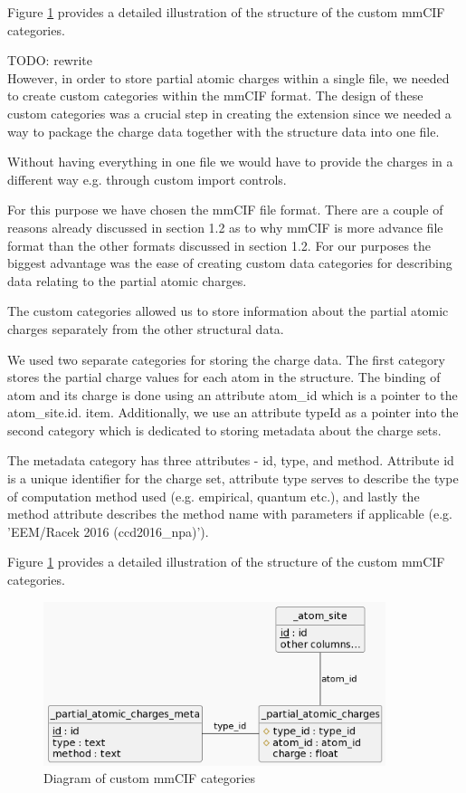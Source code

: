 \documentclass[
  digital,     %
  oneside,     %
  nosansbold,  %
  nocolorbold, %
  lof,         %
  lot,         %
]{fithesis4}
\begin{document}
Figure \ref{fig:mmcif_erd} provides a detailed illustration of the structure of the custom mmCIF categories.

TODO: rewrite \\

However, in order to store partial atomic charges within a single file, we needed to create custom categories within the mmCIF format.
The design of these custom categories was a crucial step in creating the extension since we needed a way to package the charge data together with the structure data into one file.

Without having everything in one file we would have to provide the charges in a different way e.g. through custom import controls.

For this purpose we have chosen the mmCIF file format. There are a couple of reasons already discussed in section 1.2 as to why mmCIF is more advance file format than the other formats discussed in section 1.2. For our purposes the biggest advantage was the ease of creating custom data categories for describing data relating to the partial atomic charges.

The custom categories allowed us to store information about the partial atomic charges separately from the other structural data.

We used two separate categories for storing the charge data.
The first category stores the partial charge values for each atom in the structure. The binding of atom and its charge is done using an attribute atom\_id which is a pointer to the atom\_site.id. item. Additionally, we use an attribute typeId as a pointer into the second category which is dedicated to storing metadata about the charge sets.

The metadata category has three attributes - id, type, and method. Attribute id is a unique identifier for the charge set, attribute type serves to describe the type of computation method used (e.g. empirical, quantum etc.), and lastly the method attribute describes the method name with parameters if applicable (e.g. 'EEM/Racek 2016 (ccd2016\_npa)').

Figure \ref{fig:mmcif_erd} provides a detailed illustration of the structure of the custom mmCIF categories.

\begin{figure}
  \begin{center}
    \includegraphics[width=10cm]{figures/mmcif_erd.png}
  \end{center}
  \caption{Diagram of custom mmCIF categories}
  \label{fig:mmcif_erd}
\end{figure}
\end{document}
